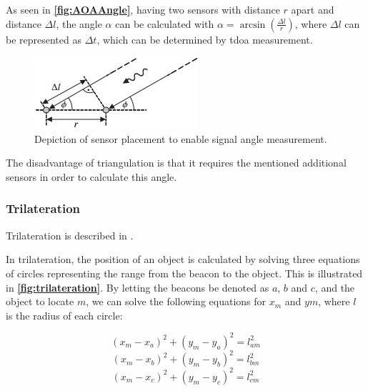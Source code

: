 As seen in \textbf{\autoref{fig:AOAAngle}}, having two sensors with distance $r$ apart and distance $\Delta l$, the angle $\alpha$ can be calculated with $\alpha = \arcsin (\frac{\Delta l}{r})$, where $\Delta l$ can be represented as $\Delta t$, which can be determined by \gls{tdoa} measurement.

\begin{figure}[H]
    \centering
    \includegraphics[scale=1.0]{Images/ProblemAnalysis/AOA_fig.jpg}
    \caption{Depiction of sensor placement to enable signal angle measurement\cite{Triangulation}.}
    \label{fig:AOAAngle}
\end{figure}

The disadvantage of triangulation is that it requires the mentioned additional sensors in order to calculate this angle.

\subsubsection{Trilateration} \label{sec:trilateration}
Trilateration is described in \cite{Triangulation}.

In trilateration, the position of an object is calculated by solving three equations of circles representing the range from the beacon to the object. This is illustrated in \textbf{\autoref{fig:trilateration}}.
By letting the beacons be denoted as $a$, $b$ and $c$, and the object to locate $m$, we can solve the following equations for $x_m$ and $ym$, where $l$ is the radius of each circle:

\begin{equation} \label{eq:CirclesCalculation1}
    (x_m - x_a)^2 + (y_m - y_a)^2 = l_{am}^2
\end{equation}
\vspace{-3mm}
\begin{equation} \label{eq:CirclesCalculation2}
    (x_m - x_b)^2 + (y_m - y_b)^2 = l_{bm}^2
\end{equation}
\vspace{-3mm}
\begin{equation} \label{eq:CirclesCalculation3}
    (x_m - x_c)^2 + (y_m - y_c)^2 = l_{cm}^2
\end{equation}

